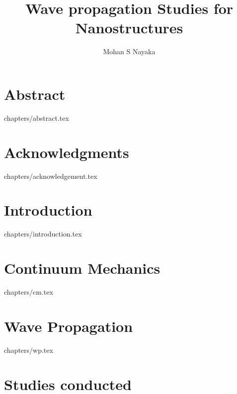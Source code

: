\documentclass[12pt,a4paper,oneside,openright,titlepage]{report}
\author{Mohan S Nayaka}
\title{Wave propagation Studies for Nanostructures}
\begin{document}
\maketitle
\tableofcontents
\chapter* {Abstract}
 {chapters/abstract.tex}
\chapter* {Acknowledgments}
 {chapters/acknowledgement.tex}
\chapter {Introduction}
 {chapters/introduction.tex}
\chapter {Continuum Mechanics}
 {chapters/cm.tex}
\chapter {Wave Propagation}
 {chapters/wp.tex}
\chapter {Studies conducted}
\end{document}
